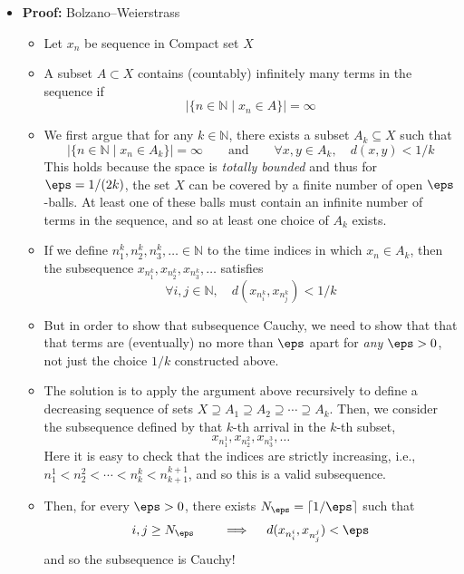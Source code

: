 \documentclass[11pt,twoside]{report}
\newcommand{\bbN}{{\mathbb{N}}}
\newcommand{\bbR}{{\mathbb{R}}}
\begin{document}
\begin{itemize}
\item \textbf{Proof:} Bolzano--Weierstrass%
\begin{itemize}
\item Let $x_n$ be sequence in Compact set $X$%

\item A subset $A \subset X$ contains (countably) infinitely many terms in the sequence if
\[
 | \{ n \in \bbN \mid x_n \in A \} | = \infty 
\]
\item We first argue that for any  $k  \in \bbN$, there exists a subset $A_k \subseteq X$ such that 
\[
 | \{ n \in \bbN \mid x_n \in A_k \} | = \infty  \qquad \text{and} \qquad  \forall x, y \in A_k, \quad  d(x,y)  < 1/k 
\]
This holds because the space is \emph{totally bounded} and thus for $\eps = 1/(2k)$, the set $X$ can be covered by a finite number of open $\eps$-balls. At least one of these balls must contain an infinite number of terms in the sequence, and so at least one choice of $A_k$ exists. 

\item If we define $n^k_1, n^k_2, n^k_3, \dots \in \bbN$  to the time indices in which $x_n \in A_k$, then the subsequence $x_{n^k_1}, x_{n^k_2}, x_{n^k_3}, \dots$ satisfies
\[
\forall i, j \in \bbN, \quad  d(x_{n_i^k},x_{n_j^k} )  < 1/k 
\]

\item But in order to show that subsequence Cauchy, we need to show that that that terms are (eventually) no more than $\eps$ apart for \emph{any} $\eps > 0$, not just the choice $1/k$ constructed above. 

\item The solution is to apply the argument above recursively to define a decreasing sequence of sets $X \supseteq A_1  \supseteq A_2 \supseteq \cdots \supseteq A_k$.  Then, we consider the subsequence defined by that $k$-th arrival in the $k$-th subset, 
\[
x_{n_1^1}, x_{n_2^2},  x_{n_3^3}, \dots
\]
Here it is easy to check that  the indices are strictly increasing, i.e., $n_1^1 <  n_2^2  < \cdots  < n_k^k  < n_{k+1}^{k+1}$, and so this is a valid subsequence. 

\item Then, for every $\eps > 0$, there exists $N_\eps = \lceil 1/\eps \rceil$ such that  %
\[
i, j \ge N_\eps  \qquad \implies \quad d(x_{n_i^i}, x_{n_j^j})  < \eps 
\]
 and so the subsequence is Cauchy!
 

\end{itemize}
\end{itemize}
\end{document}
